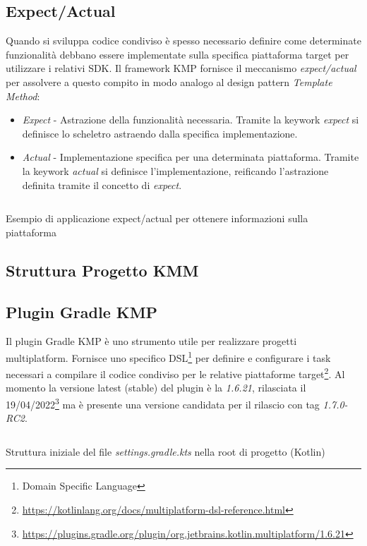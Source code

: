 \subsection{Expect/Actual}
Quando si sviluppa codice condiviso è spesso necessario definire come determinate funzionalità debbano essere implementate sulla specifica piattaforma target per utilizzare i relativi SDK. Il framework KMP fornisce il meccanismo \textit{expect/actual} per assolvere a questo compito in modo analogo al design pattern \textit{Template Method}:
\begin{itemize}
    \item \textit{Expect} - Astrazione della funzionalità necessaria. Tramite la keywork \textit{expect} si definisce lo scheletro astraendo dalla specifica implementazione.
    \item \textit{Actual} - Implementazione specifica per una determinata piattaforma. Tramite la keywork \textit{actual} si definisce l'implementazione, reificando l'astrazione definita tramite il concetto di \textit{expect}.
\end{itemize}

\begin{listing}[H]
\inputminted{kotlin}{code/3-expectactual}
\caption{Esempio di applicazione expect/actual per ottenere informazioni sulla piattaforma}
\end{listing}

\subsection{Struttura Progetto KMM}

\subsection{Plugin Gradle KMP}
Il plugin Gradle KMP è uno strumento utile per realizzare progetti multiplatform. Fornisce uno specifico DSL\footnote{Domain Specific Language} per definire e configurare i task necessari a compilare il codice condiviso per le relative piattaforme target\footnote{\url{https://kotlinlang.org/docs/multiplatform-dsl-reference.html}}. Al momento la versione latest (stable) del plugin è la \textit{1.6.21}, rilasciata il 19/04/2022\footnote{\url{https://plugins.gradle.org/plugin/org.jetbrains.kotlin.multiplatform/1.6.21}} ma è presente una versione candidata per il rilascio con tag \textit{1.7.0-RC2}.

\begin{listing}[H]
\inputminted{kotlin}{code/3-gradlekmm1}
\caption{Struttura iniziale del file \textit{settings.gradle.kts} nella root di progetto (Kotlin)}
\end{listing}

